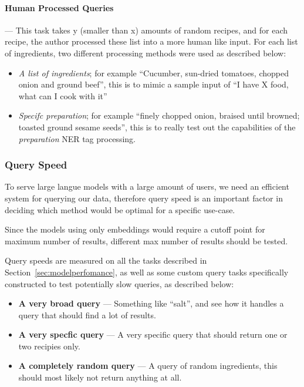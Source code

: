\documentclass[11pt]{article}
\begin{document}
\paragraph{Human Processed Queries} --- This task takes y (smaller than x)
amounts of random recipes, and for each recipe, the author processed these list
into a more human like input.
For each list of ingredients, two different processing methods were used as
described below:
\begin{itemize}
    \item \emph{A list of ingredients}; for example ``Cucumber,
        sun-dried tomatoes, chopped onion and ground beef'', this is to mimic a
        sample input of ``I have X food, what can I cook with it''
    \item \emph{Specifc preparation}; for example ``finely chopped onion,
        braised until browned; toasted ground sesame seeds'', this is to really
        test out the capabilities of the \emph{preparation} NER tag processing.
\end{itemize}

\subsubsection{Query Speed}
To serve large langue models with a large amount of users, we need an efficient
system for querying our data, therefore query speed is an important factor in
deciding which method would be optimal for a specific use-case.

Since the models using only embeddings would require a cutoff point for
maximum number of results, different max number of results should be tested.

Query speeds are measured on all the tasks described in
Section~\ref{sec:modelperfomance}, as well as some custom query tasks
specifically constructed to test potentially slow queries, as described below:
\begin{itemize}
    \item \textbf{A very broad query} --- Something like ``salt'', and see how it
        handles a query that should find a lot of results.
    \item \textbf{A very specfic query} --- A very specific query that should
        return one or two recipies only.
    \item \textbf{A completely random query} --- A query of random ingredients,
        this should most likely not return anything at all.
\end{itemize}
\end{document}

